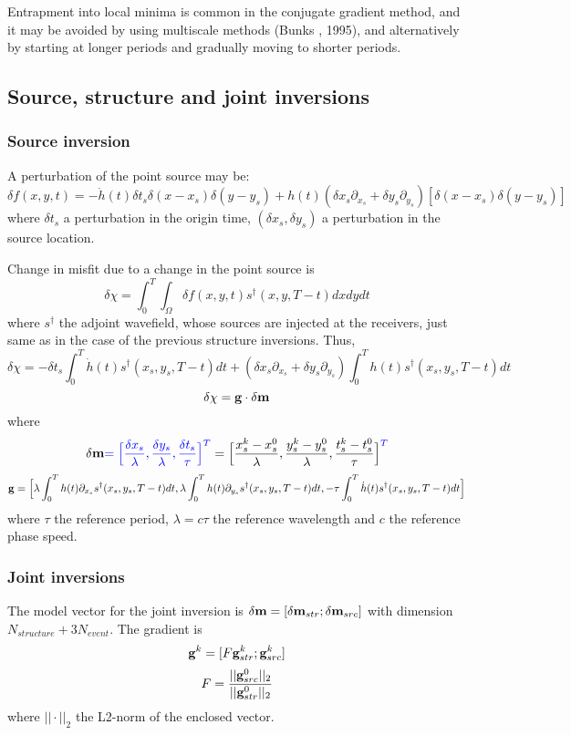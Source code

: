 Entrapment into local minima is common in the conjugate gradient method,
and it may be avoided by using multiscale methods (Bunks \etal, 1995),
and alternatively by starting at longer periods and gradually moving to shorter periods.

\subsection{Source, structure and joint inversions}
\subsubsection{Source inversion}
A perturbation of the point source may be:
\[ \delta f(x,y,t)=-\dot h(t)\delta t_s\delta(x-x_s)\delta(y-y_s)+h(t)(\delta x_s\partial_{x_s}+\delta y_s\partial_{y_s})[\delta(x-x_s)\delta(y-y_s)] \]
where $\delta t_s$ a perturbation in the origin time,
$(\delta x_s,\delta y_s)$ a perturbation in the source location.

Change in misfit due to a change in the point source is
\[ \delta\chi=\int_0^T\int_\Omega\delta f(x,y,t)s^\dagger(x,y,T-t)dxdydt \]
where $s^\dagger$ the adjoint wavefield, whose sources are injected at the receivers,
just same as in the case of the previous structure inversions.
Thus,
\[ \delta\chi=-\delta t_s\int_0^T\dot h(t)s^\dagger(x_s,y_s,T-t)dt+(\delta x_s\partial_{x_s}+\delta y_s\partial_{y_s})\int_0^Th(t)s^\dagger(x_s,y_s,T-t)dt \]
\[ \delta\chi=\mathbf{g}\cdot\delta\mathbf{m} \]
where
\[ \delta\mathbf{m}{\color{blue}=\Big[\frac{\delta x_s}{\lambda},\frac{\delta y_s}{\lambda},\frac{\delta t_s}{\tau}\Big]^T}=\Big[\frac{x_s^k-x_s^0}{\lambda},\frac{y_s^k-y_s^0}{\lambda},\frac{t_s^k-t_s^0}{\tau}\Big]^{\color{blue}T} \]
\[ \mathbf{g}=\Big[\lambda\int_0^Th(t)\partial_{x_s}s^\dagger(x_s,y_s,T-t)dt,\lambda\int_0^Th(t)\partial_{y_s}s^\dagger(x_s,y_s,T-t)dt,-\tau\int_0^T\dot h(t)s^\dagger(x_s,y_s,T-t)dt\Big] \]
where $\tau$ the reference period, $\lambda=c\tau$ the reference wavelength
and $c$ the reference phase speed.

\subsubsection{Joint inversions}
The model vector for the joint inversion is $\delta\mathbf{m}=[\delta\mathbf{m}_{str};\delta\mathbf{m}_{src}]$
with dimension $N_{structure}+3N_{event}$.
The gradient is
\[ \mathbf{g}^k=[F\mathbf{g}_{str}^k;\mathbf{g}_{src}^k] \]
\[ F=\frac{||\mathbf{g}_{src}^0||_2}{||\mathbf{g}_{str}^0||_2} \]
where $||\cdot||_2$ the L2-norm of the enclosed vector.

